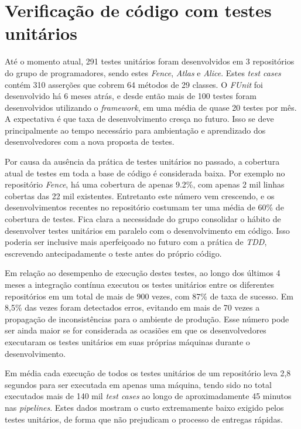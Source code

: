 \hypertarget{fence-unit-test-resultados}{%
\section{Verificação de código com testes unitários}\label{fence-unit-test-resultados}}

Até o momento atual, 291 testes unitários foram desenvolvidos em 3 repositórios do grupo de programadores, sendo estes \emph{Fence}, \emph{Atlas} e \emph{Alice}. Estes \emph{test cases} contém 310 asserções que cobrem 64 métodos de 29 classes. O \emph{FUnit} foi desenvolvido há 6 meses atrás, e desde então mais de 100 testes foram desenvolvidos utilizando o \emph{framework}, em uma média de quase 20 testes por mês. A expectativa é que taxa de desenvolvimento cresça no futuro. Isso se deve principalmente ao tempo necessário para ambientação e aprendizado dos desenvolvedores com a nova proposta de testes.

Por causa da ausência da prática de testes unitários no passado, a cobertura atual de testes em toda a base de código é considerada baixa. Por exemplo no repositório \emph{Fence}, há uma cobertura de apenas 9.2\%, com apenas 2 mil linhas cobertas das 22 mil existentes. Entretanto este número vem crescendo, e os desenvolvimentos recentes no repositório costumam ter uma média de 60\% de cobertura de testes. Fica clara a necessidade do grupo consolidar o hábito de desenvolver testes unitários em paralelo com o desenvolvimento em código. Isso poderia ser inclusive mais aperfeiçoado no futuro com a prática de \emph{TDD}, escrevendo antecipadamente o teste antes do próprio código.

Em relação ao desempenho de execução destes testes, ao longo dos últimos 4 meses a integração contínua executou os testes unitários entre os diferentes repositórios em um total de mais de 900 vezes, com 87\% de taxa de sucesso. Em 8,5\% das vezes foram detectados erros, evitando em mais de 70 vezes a propagação de inconsistências para o ambiente de produção. Esse número pode ser ainda maior se for considerada as ocasiões em que os desenvolvedores executaram os testes unitários em suas próprias máquinas durante o desenvolvimento.

Em média cada execução de todos os testes unitários de um repositório leva 2,8 segundos para ser executada em apenas uma máquina, tendo sido no total executados mais de 140 mil \emph{test cases} ao longo de aproximadamente 45 minutos nas \emph{pipelines}. Estes dados mostram o custo extremamente baixo exigido pelos testes unitários, de forma que não prejudicam o processo de entregas rápidas.
